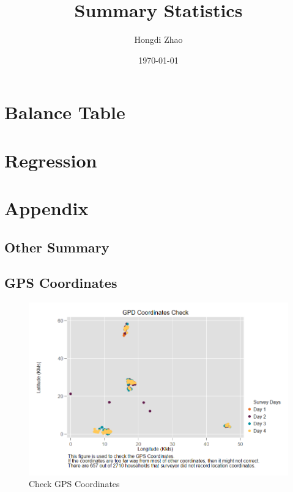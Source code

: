 \documentclass[9pt]{article}
\author{Hongdi Zhao}
\title{Summary Statistics}
\date{\today}
\begin{document}
	\maketitle
	\tableofcontents
	

\newpage
\section{Balance Table}



\newpage
\section{Regression}




\newpage
\section{Appendix}
\subsection{Other Summary}




\subsection{GPS Coordinates}
\begin{figure}[H]
	\centering
	\caption{Check GPS Coordinates}
	\includegraphics[scale=0.50]{../4_figures/gps_check_pilot.png}
\end{figure}
\end{document}
